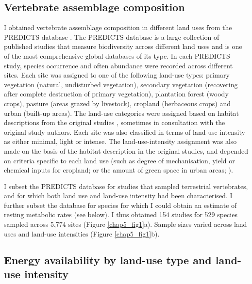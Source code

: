 \subsection{Vertebrate assemblage composition }

I obtained vertebrate assemblage composition in different land uses from the PREDICTS database \citep{Hudson2014, Hudson2017}. The PREDICTS database is a large collection of published studies that measure biodiversity across different land uses and is one of the most comprehensive global databases of its type. In each PREDICTS study, species occurrence and often abundance were recorded across different sites. Each site was assigned to one of the following land-use types: primary vegetation (natural, undisturbed vegetation), secondary vegetation (recovering after complete destruction of primary vegetation), plantation forest (woody crops), pasture (areas grazed by livestock), cropland (herbaceous crops) and urban (built-up areas). The land-use categories were assigned based on habitat descriptions from the original studies \citep{Hudson2014}, sometimes in consultation with the original study authors. Each site was also classified in terms of land-use intensity as either minimal, light or intense. The land-use-intensity assignment was also made on the basis of the habitat description in the original studies, and depended on criteria specific to each land use (such as degree of mechanisation, yield or chemical inputs for cropland; or the amount of green space in urban areas; \citet{Hudson2014}).  

I subset the PREDICTS database for studies that sampled terrestrial vertebrates, and for which both land use and land-use intensity had been characterised. I further subset the database for species for which I could obtain an estimate of resting metabolic rates (see below). I thus obtained 154 studies for 529 species sampled across 5,774 sites (Figure \ref{chap5_fig1}a). Sample sizes varied across land uses and land-use intensities (Figure \ref{chap5_fig1}b). 

\subsection{Energy availability by land-use type and land-use intensity}

